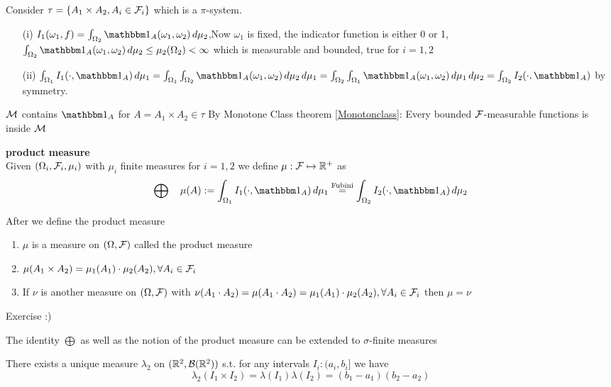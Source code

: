 Consider $\tau = \{A_1 \times A_2, A_i\in \mathcal{F}_i\}$ which is a $\pi$-system. 
\begin{enumerate}
    \item[(i)] $I_1(\omega_1, f) = \int_{\Omega_2} \I_A(\omega_1, \omega_2) \diff \mu_2$,Now $\omega_1$ is fixed, the indicator function is either 0 or 1, $\int_{\Omega_2} \I_A(\omega_1, \omega_2) \diff \mu_2 \leq \mu_2 (\Omega_2) < \infty$ which is measurable and bounded, true for $i=1,2$
    \item[(ii)] $\int_{\Omega_1} I_1(\cdot, \I_A) \diff \mu_1 = \int_{\Omega_1}\int_{\Omega_2} \I_A(\omega_1, \omega_2)\diff \mu_2 \diff \mu_1 = \int_{\Omega_2}\int_{\Omega_1} \I_A(\omega_1, \omega_2)\diff \mu_1 \diff \mu_2 = \int_{\Omega_2} I_2(\cdot, \I_A)$ by symmetry. 
\end{enumerate}
$\mathcal{M}$ contains $\I_A$ for $A = A_1 \times A_2 \in \tau$
By Monotone Class theorem \ref{Monotonclass}: Every bounded $\mathcal{F}$-measurable functions is inside $\mathcal{M}$


\newpage
\textbf{product measure} \\
Given $(\Omega_i, \mathcal{F}_i, \mu_i)$ with $\mu_i$ finite measures for $i=1,2$ we define $\mu: \mathcal{F} \mapsto \mathbb{R}^+$ as 
\begin{equation*}
    \bigoplus \quad \mu(A) := \int_{\Omega_1} I_1(\cdot, \I_A) \diff \mu_1 \stackrel{\text{Fubini}}{=} \int_{\Omega_2} I_2(\cdot, \I_A) \diff \mu_2
\end{equation*}
\begin{prop} After we define the product measure
\begin{enumerate}
    \item $\mu$ is a measure on $(\Omega, \mathcal{F})$ called the product measure
    \item $\mu(A_1 \times A_2) = \mu_1(A_1)\cdot \mu_2(A_2), \forall A_i \in \mathcal{F}_i$
    \item If $\nu$ is another measure on $(\Omega, \mathcal{F})$ with $\nu(A_1 \cdot A_2) =\mu(A_1 \cdot A_2) = \mu_1(A_1)\cdot \mu_2(A_2), \forall A_i \in \mathcal{F}_i$ then $\mu = \nu$
\end{enumerate}
\end{prop}
\pf Exercise :)

\begin{rem}
The identity $\bigoplus$ as well as the notion of the product measure can be extended to $\sigma$-finite measures
\end{rem}
\begin{cor}There exists a unique measure $\lambda_2$ on $(\mathbb{R}^2, \mathcal{B}(\mathbb{R}^2))$ s.t. for any intervals $I_i: (a_i, b_i]$ we have
\begin{equation*}
    \lambda_2(I_1 \times I_2) = \lambda(I_1)\lambda(I_2) = (b_1 - a_1)(b_2 - a_2)
\end{equation*}
\end{cor}

